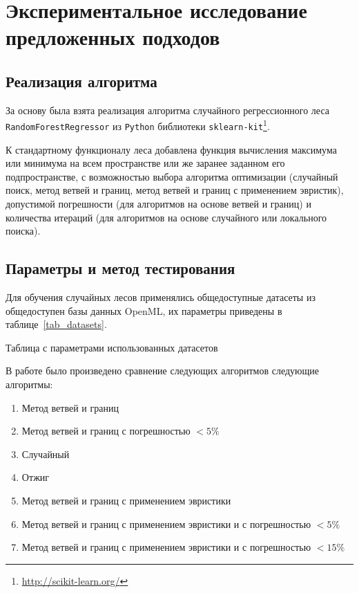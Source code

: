 \chapter{Экспериментальное исследование предложенных подходов}

\section{Реализация алгоритма}

За основу была взята реализация алгоритма случайного регрессионного леса
\texttt{RandomForestRegressor} из \texttt{Python} библиотеки
\texttt{sklearn-kit}\footnote{\url{http://scikit-learn.org/}}. 

К стандартному функционалу леса добавлена функция вычисления максимума или
минимума на всем пространстве или же заранее заданном его подпространстве,
с возможностью выбора алгоритма оптимизации (случайный поиск, метод ветвей
и границ, метод ветвей и границ с применением эвристик), допустимой погрешности
(для алгоритмов на основе ветвей и границ) и количества итераций (для алгоритмов
на основе случайного или локального поиска). 

\section{Параметры и метод тестирования}

Для обучения случайных лесов применялись общедоступные датасеты из общедоступен
базы данных OpenML, их параметры приведены в таблице~\ref{tab_datasets}.

\begin{center}
    \begin{table}[!ht]
    \caption{Таблица с параметрами использованных датасетов}\label{tab_datasets}
        
    \end{table}
\end{center}

В работе было произведено сравнение следующих алгоритмов следующие алгоритмы: 

\begin{enumerate}
        \item Метод ветвей и границ 
        \item Метод ветвей и границ с погрешностью $<5\%$
        \item Случайный
        \item Отжиг
        \item Метод ветвей и границ с применением эвристики
        \item Метод ветвей и границ с применением эвристики и с погрешностью $<5\%$
        \item Метод ветвей и границ с применением эвристики и с погрешностью $<15\%$
\end{enumerate}

